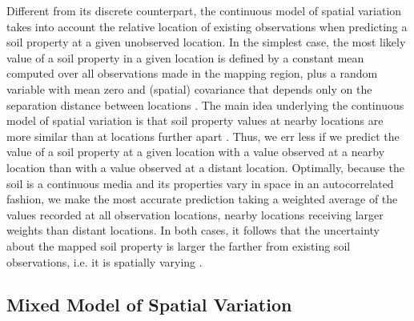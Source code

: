 Different from its discrete counterpart, the continuous model of spatial variation takes into account the 
relative location of existing observations when predicting a soil property at a given unobserved location. In 
the simplest case, the most likely value of a soil property in a given location is defined by a constant mean 
computed over all observations made in the mapping region, plus a random variable with mean zero and (spatial) 
covariance that depends only on the separation distance between locations \cite{WebsterEtAl1990, Cressie1993}. 
The main idea underlying the continuous model of spatial variation is that soil property values at nearby 
locations are more similar than at locations further apart \cite{WebsterEtAl1990}. Thus, we err less if we 
predict the value of a soil property at a given location with a value observed at a nearby location than with a 
value observed at a distant location. Optimally, because the soil is a continuous media and its properties vary 
in space in an autocorrelated fashion, we make the most accurate prediction taking a weighted average of the 
values recorded at all observation locations, nearby locations receiving larger weights than distant locations. 
In both cases, it follows that the uncertainty about the mapped soil property is larger the farther from 
existing soil observations, i.e. it is spatially varying \cite{Cressie1993}.


\subsection{Mixed Model of Spatial Variation}

